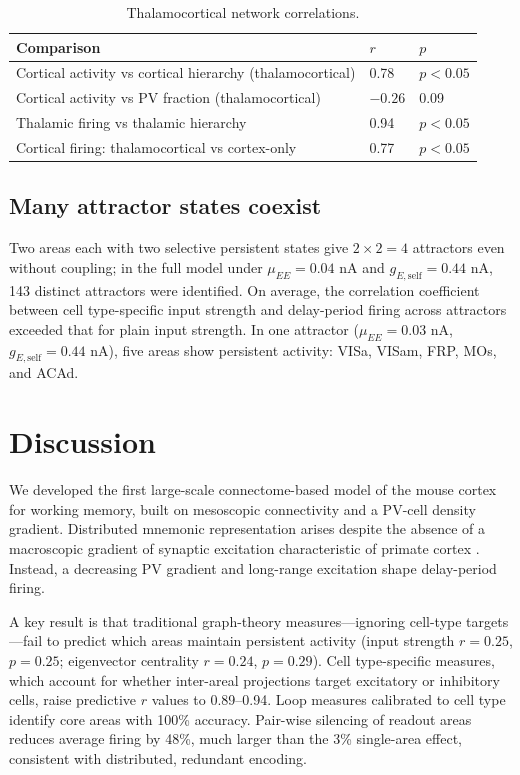 \documentclass[11pt]{article}
\begin{document}
\begin{table}[h]
\centering
\caption{Thalamocortical network correlations.}
\begin{tabular}{lll}
\toprule
Comparison & $r$ & $p$ \\
\midrule
Cortical activity vs cortical hierarchy (thalamocortical) & 0.78 & $p < 0.05$ \\
Cortical activity vs PV fraction (thalamocortical) & $-0.26$ & 0.09 \\
Thalamic firing vs thalamic hierarchy & 0.94 & $p < 0.05$ \\
Cortical firing: thalamocortical vs cortex-only & 0.77 & $p < 0.05$ \\
\bottomrule
\end{tabular}
\end{table}

\subsection{Many attractor states coexist}
Two areas each with two selective persistent states give $2\times2=4$ attractors even without coupling; in the full model under $\mu_{EE} = 0.04$ nA and $g_{E,\mathrm{self}} = 0.44$ nA, 143 distinct attractors were identified. On average, the correlation coefficient between cell type-specific input strength and delay-period firing across attractors exceeded that for plain input strength. In one attractor ($\mu_{EE} = 0.03$ nA, $g_{E,\mathrm{self}} = 0.44$ nA), five areas show persistent activity: VISa, VISam, FRP, MOs, and ACAd.

\section{Discussion}
We developed the first large-scale connectome-based model of the mouse cortex for working memory, built on mesoscopic connectivity \cite{oh2014mesoscale,gamanut2018mouse,harris2019hierarchical,kim2017brain} and a PV-cell density gradient. Distributed mnemonic representation arises despite the absence of a macroscopic gradient of synaptic excitation characteristic of primate cortex \cite{gilman2017areal,ballesteros2010density,wang2020macroscopic}. Instead, a decreasing PV gradient and long-range excitation shape delay-period firing.

A key result is that traditional graph-theory measures---ignoring cell-type targets---fail to predict which areas maintain persistent activity (input strength $r = 0.25$, $p = 0.25$; eigenvector centrality $r = 0.24$, $p = 0.29$). Cell type-specific measures, which account for whether inter-areal projections target excitatory or inhibitory cells, raise predictive $r$ values to 0.89--0.94. Loop measures calibrated to cell type identify core areas with 100\% accuracy. Pair-wise silencing of readout areas reduces average firing by 48\%, much larger than the 3\% single-area effect, consistent with distributed, redundant encoding.
\end{document}
